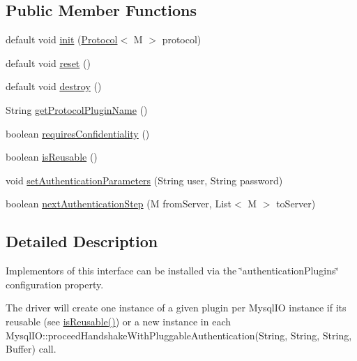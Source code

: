 \subsection*{Public Member Functions}
\begin{DoxyCompactItemize}
\item 
default void \mbox{\hyperlink{interfacecom_1_1mysql_1_1cj_1_1protocol_1_1_authentication_plugin_a418637ae8546057f1bb34fde86f5b99d}{init}} (\mbox{\hyperlink{interfacecom_1_1mysql_1_1cj_1_1protocol_1_1_protocol}{Protocol}}$<$ M $>$ protocol)
\item 
default void \mbox{\hyperlink{interfacecom_1_1mysql_1_1cj_1_1protocol_1_1_authentication_plugin_a504193fb759e76fedc7ca7b00effb44d}{reset}} ()
\item 
default void \mbox{\hyperlink{interfacecom_1_1mysql_1_1cj_1_1protocol_1_1_authentication_plugin_a1978dd8a16052ae403299d59a4412ac8}{destroy}} ()
\item 
String \mbox{\hyperlink{interfacecom_1_1mysql_1_1cj_1_1protocol_1_1_authentication_plugin_ab428486b799598c36f4506c95ff5b94b}{get\+Protocol\+Plugin\+Name}} ()
\item 
boolean \mbox{\hyperlink{interfacecom_1_1mysql_1_1cj_1_1protocol_1_1_authentication_plugin_a7dfc5f9b4c1e27d33982f8843254ee18}{requires\+Confidentiality}} ()
\item 
boolean \mbox{\hyperlink{interfacecom_1_1mysql_1_1cj_1_1protocol_1_1_authentication_plugin_afff2eda7e67e6847d2401461100e2c69}{is\+Reusable}} ()
\item 
void \mbox{\hyperlink{interfacecom_1_1mysql_1_1cj_1_1protocol_1_1_authentication_plugin_a22458c3992dbf9f91560d75a99e234d3}{set\+Authentication\+Parameters}} (String user, String password)
\item 
boolean \mbox{\hyperlink{interfacecom_1_1mysql_1_1cj_1_1protocol_1_1_authentication_plugin_a333faf4b02378d71449b6d7c44e2167c}{next\+Authentication\+Step}} (M from\+Server, List$<$ M $>$ to\+Server)
\end{DoxyCompactItemize}


\subsection{Detailed Description}
Implementors of this interface can be installed via the \char`\"{}authentication\+Plugins\char`\"{} configuration property.

The driver will create one instance of a given plugin per Mysql\+IO instance if it\textquotesingle{}s reusable (see \mbox{\hyperlink{interfacecom_1_1mysql_1_1cj_1_1protocol_1_1_authentication_plugin_afff2eda7e67e6847d2401461100e2c69}{is\+Reusable()}}) or a new instance in each Mysql\+I\+O\+::proceed\+Handshake\+With\+Pluggable\+Authentication(\+String, String, String, Buffer) call. 

